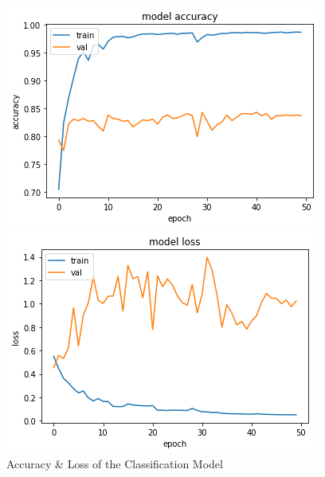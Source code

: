 \begin{figure}[H]
    \begin{minipage}[t]{0.5\linewidth}
        \centering
        \includegraphics[scale=0.5]{images/acc_graph.png}
    \end{minipage}%
    \begin{minipage}[t]{0.5\linewidth}
        \centering
        \includegraphics[scale=0.5]{images/loss_graph.png}
    \end{minipage}
    \label{fig:34}
    \caption{Accuracy \& Loss of the Classification Model}
\end{figure}




